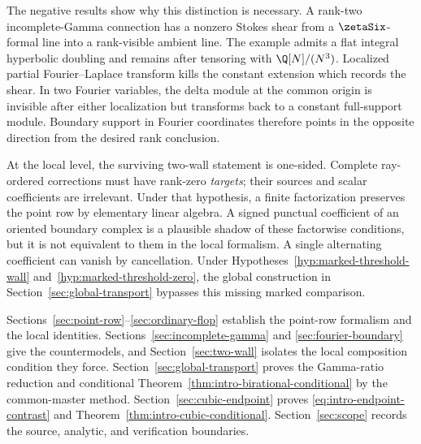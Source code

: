 The negative results show why this distinction is necessary.  A rank-two
incomplete-Gamma connection has a nonzero Stokes shear from a
\(\zetaSix\)-formal line into a rank-visible ambient line.  The example admits
a flat integral hyperbolic doubling and remains after tensoring with
\(\Q[N]/(N^3)\).  Localized partial Fourier--Laplace transform kills
the constant extension which records the shear.  In two Fourier variables,
the delta module at the common origin is invisible after either localization
but transforms back to a constant full-support module.  Boundary support in
Fourier coordinates therefore points in the opposite direction from the
desired rank conclusion.

At the local level, the surviving two-wall statement is one-sided.  Complete
ray-ordered
corrections must have rank-zero \emph{targets}; their sources and scalar
coefficients are irrelevant.  Under that hypothesis, a finite factorization
preserves the point row by elementary linear algebra.  A signed punctual
coefficient of an oriented boundary complex is a plausible shadow of these
factorwise conditions, but it is not equivalent to them in the local
formalism.  A single alternating coefficient can vanish by cancellation.
Under Hypotheses~\ref{hyp:marked-threshold-wall}
and~\ref{hyp:marked-threshold-zero}, the global construction in
Section~\ref{sec:global-transport} bypasses this missing marked comparison.

Sections~\ref{sec:point-row}--\ref{sec:ordinary-flop} establish the point-row
formalism and the local identities.  Sections~\ref{sec:incomplete-gamma} and
\ref{sec:fourier-boundary} give the countermodels, and
Section~\ref{sec:two-wall} isolates the local composition condition they
force.  Section~\ref{sec:global-transport} proves the Gamma-ratio reduction
and conditional Theorem~\ref{thm:intro-birational-conditional} by the
common-master method.  Section~\ref{sec:cubic-endpoint} proves
\eqref{eq:intro-endpoint-contrast} and
Theorem~\ref{thm:intro-cubic-conditional}.  Section~\ref{sec:scope} records the source,
analytic, and verification boundaries.

